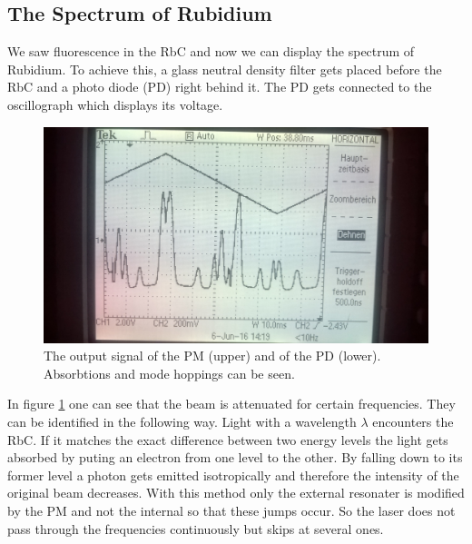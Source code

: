 \subsection{The Spectrum of Rubidium}
We saw fluorescence in the RbC and now we can display the spectrum of Rubidium. To achieve this, a glass neutral density filter gets placed before the RbC and
a photo diode (PD) right behind it. The PD gets connected to the oscillograph which displays its voltage.
\begin{figure}[t]
 \includegraphics[width=\textwidth]{../pics/peaks.jpg}
 \caption{The output signal of the PM (upper) and of the PD (lower). Absorbtions and mode hoppings can be seen.}
 \label{pic_peak1}
\end{figure}
In figure \ref{pic_peak1} one can see that the beam is attenuated for certain frequencies. They can be identified in the following way. Light with a wavelength
$\lambda$ encounters the RbC. If it matches the exact difference between two energy levels the light gets absorbed by puting an electron from one level to
the other. By falling down to its former level a photon gets emitted isotropically and therefore the intensity of the original beam decreases.
With this method only the external resonater is modified by the PM and not the internal so that these jumps occur. So the laser does not pass through the 
frequencies continuously but skips at several ones.

